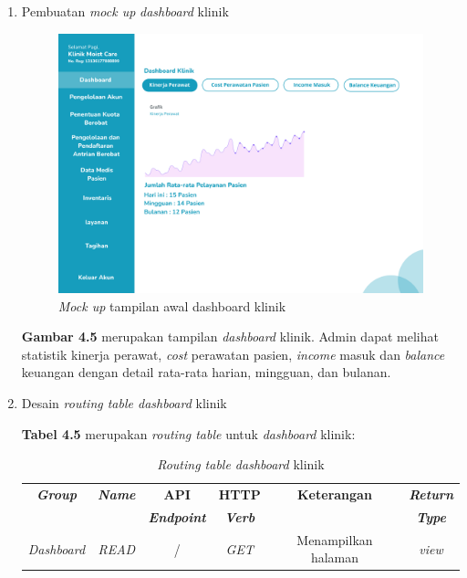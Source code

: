 \begin{enumerate}
	\item Pembuatan \emph{mock up} \emph{dashboard} klinik
	
	\begin{figure}[H]
		\centering
		\includegraphics[width=12cm]{gambar/mockup_web/dashboard.png}
		\caption{\emph{Mock up} tampilan awal dashboard klinik}
		\label{Gambar:pengelolaanantrian2}
	\end{figure}
	
	\textbf{Gambar 4.5} merupakan tampilan \emph{dashboard} klinik. Admin dapat melihat statistik kinerja perawat, \emph{cost} perawatan pasien, \emph{income} masuk dan \emph{balance} keuangan dengan detail rata-rata harian, mingguan, dan bulanan.
	
	\item Desain \emph{routing table dashboard} klinik
	
	\textbf{Tabel 4.5} merupakan \emph{routing table} untuk \emph{dashboard} klinik:
	
	\begin{table}[H]
		\centering
		\caption{\emph{Routing table dashboard} klinik}
		\label{tabel_input}
		\begin{tabular}{|c|c|c|c|c|c|}
			\hline
			\textbf{\emph{Group}} & \textbf{\emph{Name}} & \textbf{API} & \textbf{HTTP} & \textbf{Keterangan} & \textbf{\emph{Return}} \\
			
			& & \textbf{\emph{Endpoint}} & \textbf{\emph{Verb}} & & \textbf{\emph{Type}} \\
			\hline
			
			\emph{Dashboard}& 
			\emph{READ} &
			/ &
			\emph{GET} &
			Menampilkan halaman &
			\emph{view}\\
			

\end{tabular}
\end{table}
\end{enumerate}
